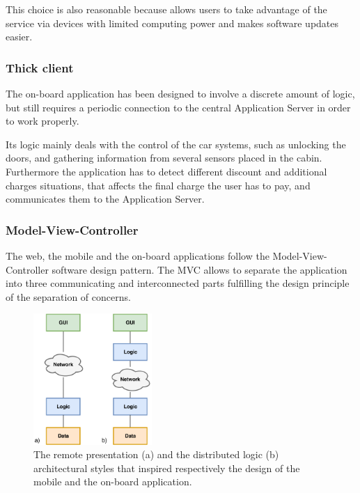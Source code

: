 This choice is also reasonable because allows users to take advantage of the service via devices with limited computing power and makes software updates easier.

\subsubsection{Thick client}
The on-board application has been designed to involve a discrete amount of logic, but still requires a periodic connection to the central Application Server in order to work properly.

Its logic mainly deals with the control of the car systems, such as unlocking the doors, and gathering information from several sensors placed in the cabin. Furthermore the application has to detect different discount and additional charges situations, that affects the final charge the user has to pay, and communicates them to the Application Server.

\subsubsection{Model-View-Controller}
The web, the mobile and the on-board applications follow the Model-View-Controller software design pattern. The MVC allows to separate the application into three communicating and interconnected parts fulfilling the design principle of the separation of concerns.


\begin{figure}[H]
\begin{center}
		\includegraphics[width=0.4\textwidth]{./arch_design/diagrams/architectural_patterns.png}
		\caption{The remote presentation (a) and the distributed logic (b) architectural styles that inspired respectively the design of the mobile and the on-board application.}
		\label{arch_patterns}
\end{center}
\end{figure}